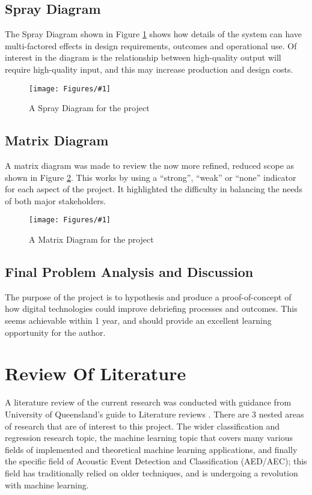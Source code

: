 \documentclass{UoNMCHA}
\newcommand{\fref}[1] {Figure \ref{#1}}
\newcommand{\fFigure}[3]{
	\begin{figure}[h]
        \begin{center}  
            \texttt{[image: Figures/\#1]}  
            \caption{#2}
            \label{#1}
        \end{center}
	\end{figure}
}
\numberwithin{equation}{section}
\begin{document}
\subsection{Spray Diagram}
The Spray Diagram shown in \fref{SprayDiagram.png} shows how details of the system can have multi-factored effects in design requirements, outcomes and operational use. Of interest in the diagram is the relationship between high-quality output will require high-quality input, and this may increase production and design costs. 
\fFigure{SprayDiagram.png}{A Spray Diagram for the project}{1}

\subsection{Matrix Diagram}
A matrix diagram was made to review the now more refined, reduced scope as shown in \fref{MatrixDiagram.png}. This works by using a “strong”, “weak” or “none” indicator for each aspect of the project. It highlighted the difficulty in balancing the needs of both major stakeholders. 
\fFigure{MatrixDiagram.png}{A Matrix Diagram for the project}{0.8}

\subsection{Final Problem Analysis and Discussion}
The purpose of the project is to hypothesis and produce a proof-of-concept of how digital technologies could improve debriefing processes and outcomes. This seems achievable within 1 year, and should provide an excellent learning opportunity for the author.

\section{Review Of Literature}\label{sec:LitReview}
A literature review of the current research was conducted with guidance from University of Queensland’s guide to Literature reviews \cite{QueenslandReview} . There are 3 nested areas of research that are of interest to this project. The wider classification and regression research topic, the machine learning topic that covers many various fields of implemented and theoretical machine learning applications, and finally the specific field of Acoustic Event Detection and Classification (AED/AEC); this field has traditionally relied on older techniques, and is undergoing a revolution with machine learning. 
\end{document}
